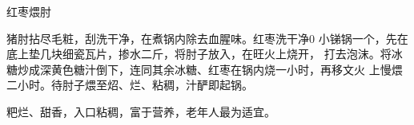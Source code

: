 \begin{recipe}{红枣煨肘}

\ingredients


\preparation

\step 猪肘拈尽毛粧，刮洗干净，在煮锅内除去血腥味。红枣洗干净0
\step 小锑锅一个，先在底上垫几块细瓷瓦片，掺水二斤，将肘子放入，在旺火上烧开，
打去泡沫。将冰糖炒成深黄色糖汁倒下，连同其余冰糖、红枣在锅内烧一小时，再移文火
上慢煨二小时。待肘子煨至炤、烂、粘稠，汁酽即起锅。

\features

粑烂、甜香，入口粘稠，富于营养，老年人最为适宜。

\end{recipe}

